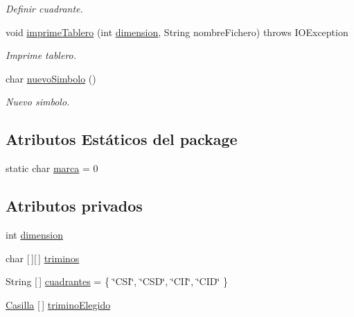 \begin{DoxyCompactItemize}
\begin{DoxyCompactList}\small\item\em Definir cuadrante. \end{DoxyCompactList}\item 
void \mbox{\hyperlink{classtrimino_1_1Tablero_aafa29cfec6831d2ad31eeb715eb93bee}{imprime\+Tablero}} (int \mbox{\hyperlink{classtrimino_1_1Tablero_a99d732d6a9b3b2d75ed7bc5bbe6a22f7}{dimension}}, String nombre\+Fichero)  throws I\+O\+Exception 
\begin{DoxyCompactList}\small\item\em Imprime tablero. \end{DoxyCompactList}\item 
char \mbox{\hyperlink{classtrimino_1_1Tablero_a146790a6abfaef08ab62fb5b82cc3cd1}{nuevo\+Simbolo}} ()
\begin{DoxyCompactList}\small\item\em Nuevo simbolo. \end{DoxyCompactList}\end{DoxyCompactItemize}
\subsection*{Atributos Estáticos del \textquotesingle{}package\textquotesingle{}}
\begin{DoxyCompactItemize}
\item 
static char \mbox{\hyperlink{classtrimino_1_1Tablero_a8b1b74a3a0b60de392313de57a6ea404}{marca}} = \textquotesingle{}0\textquotesingle{}
\end{DoxyCompactItemize}
\subsection*{Atributos privados}
\begin{DoxyCompactItemize}
\item 
int \mbox{\hyperlink{classtrimino_1_1Tablero_a99d732d6a9b3b2d75ed7bc5bbe6a22f7}{dimension}}
\item 
char \mbox{[}$\,$\mbox{]}\mbox{[}$\,$\mbox{]} \mbox{\hyperlink{classtrimino_1_1Tablero_ab8955124b813666eeff506cf3a71c387}{triminos}}
\item 
String \mbox{[}$\,$\mbox{]} \mbox{\hyperlink{classtrimino_1_1Tablero_ac1b1c9acb509c594fcae4b7d7ebb765e}{cuadrantes}} = \{ \char`\"{}C\+SI\char`\"{}, \char`\"{}C\+SD\char`\"{}, \char`\"{}C\+II\char`\"{}, \char`\"{}C\+ID\char`\"{} \}
\item 
\mbox{\hyperlink{classtrimino_1_1Casilla}{Casilla}} \mbox{[}$\,$\mbox{]} \mbox{\hyperlink{classtrimino_1_1Tablero_ae28469f3840e1b257a45e3002f04cd7a}{trimino\+Elegido}}
\end{DoxyCompactItemize}


